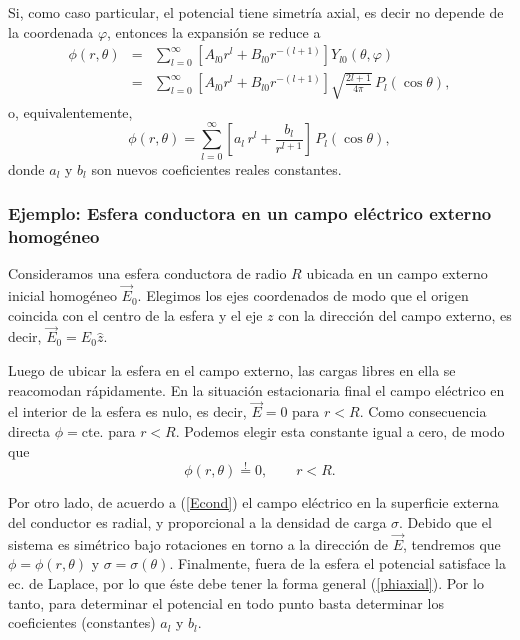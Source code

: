 Si, como caso particular, el potencial tiene simetría axial, es decir no
depende de la coordenada $\varphi$, entonces la expansión se reduce a
\begin{eqnarray}
  \phi(r,\theta) &=& \sum_{l=0}^\infty\left[
  A_{l0}  r^l + B_{l0}  r^{-(l+1)}\right]  Y_{l0}(\theta,\varphi) \\
&=&\sum_{l=0}^\infty\left[  A_{l0}  r^l + B_{l0}
r^{-(l+1)}\right]\sqrt{\frac{2l+1}{4\pi}}\,P_l(\cos\theta) ,
\end{eqnarray}
o, equivalentemente,
\begin{equation}\label{phiaxial}
\boxed{\phi(r,\theta)=\sum_{l=0}^\infty\left[  a_l\,  r^l +
\frac{b_l}{r^{l+1}}\right]\,P_l(\cos\theta),}
\end{equation}
donde $a_l$ y $b_l$ son nuevos coeficientes reales constantes.

\subsubsection{Ejemplo: Esfera conductora en un campo eléctrico externo homogéneo}\label{sec:esfcond}

Consideramos una esfera conductora de radio $R$ ubicada en un campo externo inicial homogéneo $\vec{E}_0$. Elegimos los ejes coordenados de modo que el origen coincida con el centro de la esfera y el eje $z$ con la dirección del campo externo, es decir, $\vec{E}_0=E_0\hat{z}$.

Luego de ubicar la esfera en el campo externo, las cargas libres en ella se reacomodan rápidamente. En la situación estacionaria final el campo eléctrico en el interior de la esfera es nulo, es decir, $\vec{E}=0$ para $r<R$. Como consecuencia directa $\phi=\text{cte.}$ para $r<R$. Podemos elegir esta constante igual a cero, de modo que
\begin{equation}
\phi(r,\theta)\stackrel{!}{=}0, \qquad r<R.
\end{equation}

Por otro lado, de acuerdo a (\ref{Econd}) el campo eléctrico en la superficie externa del conductor es radial, y proporcional a la densidad de carga $\sigma$. Debido que el sistema es simétrico bajo rotaciones en torno a la dirección de $\vec{E}$, tendremos que $\phi=\phi(r,\theta)$ y $\sigma=\sigma(\theta)$. Finalmente, fuera de la esfera el potencial satisface la ec. de Laplace, por lo que éste debe tener la forma general (\ref{phiaxial}). Por lo tanto, para determinar el potencial en todo punto basta determinar los coeficientes (constantes) $a_l$ y $b_l$.

